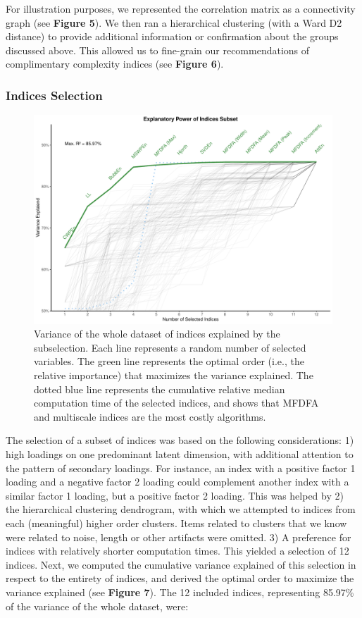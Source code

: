 \documentclass[
  man]{apa6}
\begin{document}
For illustration purposes, we represented the correlation matrix as a connectivity graph (see \textbf{Figure 5}). We then ran a hierarchical clustering (with a Ward D2 distance) to provide additional information or confirmation about the groups discussed above. This allowed us to fine-grain our recommendations of complimentary complexity indices (see \textbf{Figure 6}).

\hypertarget{indices-selection}{%
\subsubsection{Indices Selection}\label{indices-selection}}

\begin{figure}
\centering
\includegraphics{./figures/varexplained-1.pdf}
\caption{\label{fig:varexplained}Variance of the whole dataset of indices explained by the subselection. Each line represents a random number of selected variables. The green line represents the optimal order (i.e., the relative importance) that maximizes the variance explained. The dotted blue line represents the cumulative relative median computation time of the selected indices, and shows that MFDFA and multiscale indices are the most costly algorithms.}
\end{figure}

The selection of a subset of indices was based on the following considerations: 1) high loadings on one predominant latent dimension, with additional attention to the pattern of secondary loadings. For instance, an index with a positive factor 1 loading and a negative factor 2 loading could complement another index with a similar factor 1 loading, but a positive factor 2 loading. This was helped by 2) the hierarchical clustering dendrogram, with which we attempted to indices from each (meaningful) higher order clusters. Items related to clusters that we know were related to noise, length or other artifacts were omitted. 3) A preference for indices with relatively shorter computation times. This yielded a selection of 12 indices. Next, we computed the cumulative variance explained of this selection in respect to the entirety of indices, and derived the optimal order to maximize the variance explained (see \textbf{Figure 7}). The 12 included indices, representing 85.97\% of the variance of the whole dataset, were:
\end{document}
